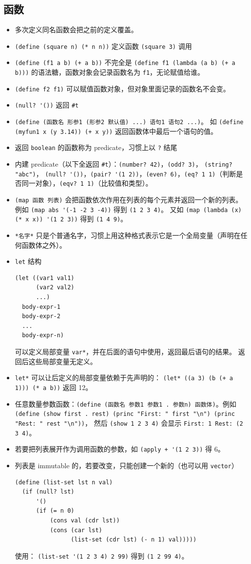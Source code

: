 \subsection{函数}
\begin{itemize}
\item 多次定义同名函数会把之前的定义覆盖。
\item \verb`(define (square n) (* n n))` 定义函数 \verb`(square 3)` 调用
\item \verb`(define (f1 a b) (+ a b))` 不完全是 \verb`(define f1 (lambda (a b) (+ a b)))` 的语法糖，函数对象会记录函数名为 \verb`f1`，无论赋值给谁。
\item \verb`(define f2 f1)` 可以赋值函数对象，但对象里面记录的函数名不会变。
\item \verb`(null? '())` 返回 \verb`#t`
\item \verb`(define (函数名 形参1 (形参2 默认值) ...) 语句1 语句2 ...)`。 如 \verb`(define (myfun1 x (y 3.14)) (+ x y))` 返回函数体中最后一个语句的值。
\item 返回 \verb`boolean` 的函数称为 predicate，习惯上以 \verb`?` 结尾
\item 内建 predicate（以下全返回 \verb`#t`）：\verb`(number? 42)`，\verb`(odd? 3)`， \verb`(string? "abc")`， \verb`(null? '())`，\verb`(pair? '(1 2))`，\verb`(even? 6)`，\verb`(eq? 1 1)`（判断是否同一对象），\verb`(eqv? 1 1)`（比较值和类型）。
\item \verb`(map 函数 列表)` 会把函数依次作用在列表的每个元素并返回一个新的列表。 例如 \verb`(map abs '(-1 -2 3 -4))` 得到 \verb`(1 2 3 4)`。 又如 \verb`(map (lambda (x) (* x x)) '(1 2 3))` 得到 \verb`(1 4 9)`。
\item \verb`*名字*` 只是个普通名字，习惯上用这种格式表示它是一个全局变量（声明在任何函数体之外）。
\item \verb`let` 结构
\begin{lstlisting}[language=none]
(let ((var1 val1)
      (var2 val2)
      ...)
  body-expr-1
  body-expr-2
  ...
  body-expr-n)
\end{lstlisting}
可以定义局部变量 \verb`var*`，并在后面的语句中使用，返回最后语句的结果。 返回后这些局部变量无定义。
\item \verb`let*` 可以让后定义的局部变量依赖于先声明的： \verb`(let* ((a 3) (b (+ a 1))) (* a b))` 返回 12。
\item 任意数量参数函数：\verb`(define (函数名 参数1 参数1 . 参数n) 函数体)`。例如 \verb`(define (show first . rest) (princ "First: " first "\n") (princ "Rest: " rest "\n"))`， 然后 \verb`(show 1 2 3 4)` 会显示 \verb`First: 1 Rest: (2 3 4)`。
\item 若要把列表展开作为调用函数的参数，如 \verb`(apply + '(1 2 3))` 得 6。
\item 列表是 immutable 的，若要改变，只能创建一个新的（也可以用 \verb`vector`）
\begin{lstlisting}[language=none]
(define (list-set lst n val)
  (if (null? lst)
      '()
      (if (= n 0)
          (cons val (cdr lst))
          (cons (car lst)
                (list-set (cdr lst) (- n 1) val)))))
\end{lstlisting}
使用： \verb`(list-set '(1 2 3 4) 2 99)` 得到 \verb`(1 2 99 4)`。
\end{itemize}


